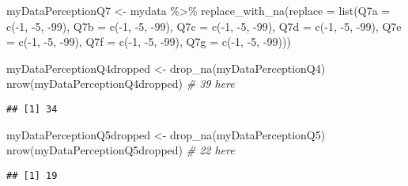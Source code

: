 \documentclass[
]{article}
\newenvironment{Shaded}{\begin{snugshade}}{\end{snugshade}}
\newcommand{\AttributeTok}[1]{\textcolor[rgb]{0.77,0.63,0.00}{#1}}
\newcommand{\CommentTok}[1]{\textcolor[rgb]{0.56,0.35,0.01}{\textit{#1}}}
\newcommand{\DecValTok}[1]{\textcolor[rgb]{0.00,0.00,0.81}{#1}}
\newcommand{\FunctionTok}[1]{\textcolor[rgb]{0.00,0.00,0.00}{#1}}
\newcommand{\NormalTok}[1]{#1}
\newcommand{\OtherTok}[1]{\textcolor[rgb]{0.56,0.35,0.01}{#1}}
\newcommand{\SpecialCharTok}[1]{\textcolor[rgb]{0.00,0.00,0.00}{#1}}
\begin{document}
\begin{Shaded}
\begin{Highlighting}[]
\NormalTok{myDataPerceptionQ7 }\OtherTok{\textless{}{-}}\NormalTok{ mydata }\SpecialCharTok{\%\textgreater{}\%} \FunctionTok{replace\_with\_na}\NormalTok{(}\AttributeTok{replace =} \FunctionTok{list}\NormalTok{(}\AttributeTok{Q7a =} \FunctionTok{c}\NormalTok{(}\SpecialCharTok{{-}}\DecValTok{1}\NormalTok{, }\SpecialCharTok{{-}}\DecValTok{5}\NormalTok{, }\SpecialCharTok{{-}}\DecValTok{99}\NormalTok{), }\AttributeTok{Q7b =} \FunctionTok{c}\NormalTok{(}\SpecialCharTok{{-}}\DecValTok{1}\NormalTok{, }\SpecialCharTok{{-}}\DecValTok{5}\NormalTok{, }\SpecialCharTok{{-}}\DecValTok{99}\NormalTok{), }\AttributeTok{Q7c =} \FunctionTok{c}\NormalTok{(}\SpecialCharTok{{-}}\DecValTok{1}\NormalTok{, }\SpecialCharTok{{-}}\DecValTok{5}\NormalTok{, }\SpecialCharTok{{-}}\DecValTok{99}\NormalTok{), }\AttributeTok{Q7d =} \FunctionTok{c}\NormalTok{(}\SpecialCharTok{{-}}\DecValTok{1}\NormalTok{, }\SpecialCharTok{{-}}\DecValTok{5}\NormalTok{, }\SpecialCharTok{{-}}\DecValTok{99}\NormalTok{), }\AttributeTok{Q7e =} \FunctionTok{c}\NormalTok{(}\SpecialCharTok{{-}}\DecValTok{1}\NormalTok{, }\SpecialCharTok{{-}}\DecValTok{5}\NormalTok{, }\SpecialCharTok{{-}}\DecValTok{99}\NormalTok{), }\AttributeTok{Q7f =} \FunctionTok{c}\NormalTok{(}\SpecialCharTok{{-}}\DecValTok{1}\NormalTok{, }\SpecialCharTok{{-}}\DecValTok{5}\NormalTok{, }\SpecialCharTok{{-}}\DecValTok{99}\NormalTok{), }\AttributeTok{Q7g =} \FunctionTok{c}\NormalTok{(}\SpecialCharTok{{-}}\DecValTok{1}\NormalTok{, }\SpecialCharTok{{-}}\DecValTok{5}\NormalTok{, }\SpecialCharTok{{-}}\DecValTok{99}\NormalTok{)))}


\NormalTok{myDataPerceptionQ4dropped }\OtherTok{\textless{}{-}} \FunctionTok{drop\_na}\NormalTok{(myDataPerceptionQ4)}
\FunctionTok{nrow}\NormalTok{(myDataPerceptionQ4dropped) }\CommentTok{\# 39 here}
\end{Highlighting}
\end{Shaded}

\begin{verbatim}
## [1] 34
\end{verbatim}

\begin{Shaded}
\begin{Highlighting}[]
\NormalTok{myDataPerceptionQ5dropped }\OtherTok{\textless{}{-}} \FunctionTok{drop\_na}\NormalTok{(myDataPerceptionQ5)}
\FunctionTok{nrow}\NormalTok{(myDataPerceptionQ5dropped) }\CommentTok{\# 22 here}
\end{Highlighting}
\end{Shaded}

\begin{verbatim}
## [1] 19
\end{verbatim}
\end{document}
